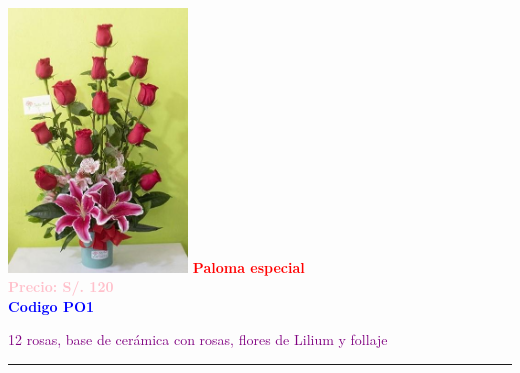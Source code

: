 \begin{multicols}{2}
    \begin{minipage}{\linewidth}
        \centering
        \includegraphics[height=7cm]{imagenes_extraidas/image_9_2} %
        \newline
        \vspace{0.1cm}
        \textbf{\Large \textcolor{red}{Paloma especial}} \\ %
        \vspace{0.2cm}
        \textbf{\textcolor{pink}{Precio: S/. 120}} \\ %
        \vspace{0.2cm}
        \textbf{\textcolor{blue}{Codigo PO1}} \\ %
        \vspace{0.2cm}
        \begin{minipage}{0.8\linewidth} 
            \small \textcolor{purple}{12 rosas, base de cerámica con rosas, flores de Lilium y follaje} %
        \end{minipage}
        \vspace{0.1cm}        
        \rule{\linewidth}{0.5pt}
    \end{minipage}
    

\end{multicols}
